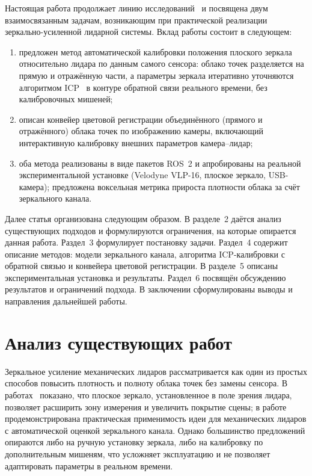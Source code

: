 \documentclass{misisarticle}
\begin{document}
Настоящая работа продолжает линию исследований~\cite{VisFed26}
и посвящена двум взаимосвязанным задачам, возникающим при практической
реализации зеркально-усиленной лидарной системы. Вклад работы состоит
в следующем:
\begin{enumerate}
  \item предложен метод автоматической калибровки положения плоского
        зеркала относительно лидара по данным самого сенсора: облако
        точек разделяется на прямую и отражённую части, а параметры
        зеркала итеративно уточняются алгоритмом ICP~\cite{Besl1992ICP}
        в контуре обратной связи реального времени, без калибровочных
        мишеней;
  \item описан конвейер цветовой регистрации объединённого (прямого и
        отражённого) облака точек по изображению камеры, включающий
        интерактивную калибровку внешних параметров камера--лидар;
  \item оба метода реализованы в виде пакетов ROS~2 и апробированы на
        реальной экспериментальной установке (Velodyne VLP-16,
        плоское зеркало, USB-камера); предложена воксельная метрика
        прироста плотности облака за счёт зеркального канала.
\end{enumerate}

Далее статья организована следующим образом. В разделе~2 даётся
анализ существующих подходов и формулируются ограничения, на которые
опирается данная работа. Раздел~3 формулирует постановку задачи.
Раздел~4 содержит описание методов: модели зеркального канала,
алгоритма ICP-калибровки с обратной связью и конвейера цветовой
регистрации. В разделе~5 описаны экспериментальная установка и
результаты. Раздел~6 посвящён обсуждению результатов и
ограничений подхода. В заключении сформулированы выводы и направления
дальнейшей работы.

\section{Анализ существующих работ}

Зеркальное усиление механических лидаров рассматривается как один из
простых способов повысить плотность и полноту облака точек без замены
сенсора. В работах~\cite{Matsubara2020MirrorLiDAR,
Pogacnik2022MultiperspectiveLiDAR} показано, что плоское зеркало,
установленное в поле зрения лидара, позволяет расширить зону
измерения и увеличить покрытие сцены; в работе~\cite{VisFed26}
продемонстрирована практическая применимость идеи для механических
лидаров с автоматической оценкой зеркального канала. Однако
большинство предложений опираются либо на ручную установку зеркала,
либо на калибровку по дополнительным мишеням, что усложняет
эксплуатацию и не позволяет адаптировать параметры в реальном времени.
\end{document}

